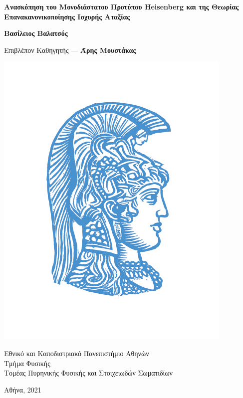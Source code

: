 \documentclass[../main.tex]{subfiles}
\begin{document}
\begin{titlepage}
\begin{center}
        \vspace{2cm}

        \Huge
        \textbf{Ανασκόπηση του Μονοδιάστατου Προτύπου Heisenberg και της Θεωρίας Επανακανονικοποίησης Ισχυρής Αταξίας}
            
        \vspace{2cm}
        \huge
        \textbf{Βασίλειος Βαλατσός}
        
        \Large
        \vspace{1cm}
        Επιβλέπον Καθηγητής --- \textbf{Άρης Μουστάκας}

        \vspace{1cm}
        \includegraphics[scale=1.8]{university.jpg}
        

        Εθνικό και Καποδιστριακό Πανεπιστήμιο Αθηνών\\
        Τμήμα Φυσικής\\
        Τομέας Πυρηνικής Φυσικής και Στοιχειωδών Σωματιδίων
        
        \vfill
        Αθήνα, 2021
\end{center}
\end{titlepage}
\end{document}
